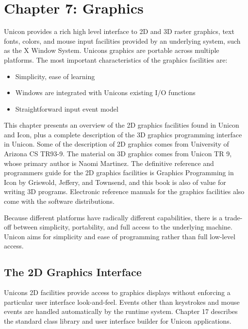 \clearpage\section{Chapter 7: Graphics}

Unicon provides a rich high level interface to 2D and 3D raster
graphics, text fonts, colors, and mouse input facilities provided by an
underlying system, such as the X Window System.
Unicon{\textquotesingle}s graphics are portable across multiple
platforms. The most important characteristics of the graphics
facilities are:

\begin{itemize}
\item Simplicity, ease of learning
\item Windows are integrated with Unicon{\textquotesingle}s existing I/O
functions
\item Straightforward input event model
\end{itemize}
This chapter presents an overview of the 2D graphics facilities found in
Unicon and Icon, plus a complete description of the 3D graphics
programming interface in Unicon. Some of the description of 2D graphics
comes from University of Arizona CS TR93-9. The material on 3D graphics
comes from Unicon TR 9, whose primary author is Naomi Martinez. The
definitive reference and programmer{\textquotesingle}s guide for the 2D
graphics facilities is {\textquotedbl}Graphics Programming in
Icon{\textquotedbl} by Griswold, Jeffery, and Townsend, and this book
is also of value for writing 3D programs. Electronic reference manuals
for the graphics facilities also come with the software distributions.

Because different platforms have radically different capabilities, there
is a trade-off between simplicity, portability, and full access to the
underlying machine. Unicon aims for simplicity and ease of programming
rather than full low-level access.

\subsection{The 2D Graphics Interface}

Unicon{\textquotesingle}s 2D facilities provide access to graphics
displays without enforcing a particular user interface look-and-feel.
Events other than keystrokes and mouse events are handled automatically
by the runtime system. Chapter 17 describes the standard class library
and user interface builder for Unicon applications.

